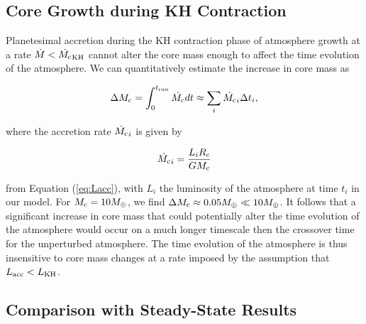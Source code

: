 \documentclass[apj]{emulateapj}
\newcommand{\co}{_{\rm c}}
\begin{document}
\subsection{Core Growth during KH Contraction}
\label{raf3}

Planetesimal accretion during the KH contraction phase of atmosphere growth at a rate $\dot{M}<\dot{M\co}_{\rm{KH}}$  cannot alter the core mass enough to affect the time evolution of the atmosphere. We can quantitatively estimate the increase in core mass as 

\begin{equation}
\label{eq:cminc}
\Delta M_{\rm{c}} = \int_0^{t_{\rm{run}}} \dot{M_{\rm{c}}} dt \approx \sum_i \dot{M_{\rm{c}}}_i \Delta t_i,
\end{equation}
 
 \noindent where the accretion rate $ \dot{M_{\rm{c}}}_i $ is given by 
 
 \begin{equation}
 \label{eq:Mdotexp}
 \dot{M_{\rm{c}}}_i =\frac{L_i R\co}{G M_{\rm{c}}} 
 \end{equation}
 
 \noindent from Equation (\ref{eq:Lacc}), with $L_i$ the luminosity of the atmosphere at time $t_i$ in our model. For $M_{\rm{c}}=10 M_{\oplus}$, we find $\Delta M_{\rm{c}} \approx 0.05 M_{\oplus} \ll 10 M_{\oplus}$. It follows that a significant increase in core mass that could potentially alter the time evolution of the atmosphere would occur on a much longer timescale then the crossover time for the unperturbed atmosphere. The time evolution of the atmosphere is thus insensitive to core mass changes at a rate imposed by the assumption that $L_{\rm{acc}}<L_{\rm{KH}}$.



\subsection{Comparison with Steady-State Results}
\label{raf2}
\end{document}

